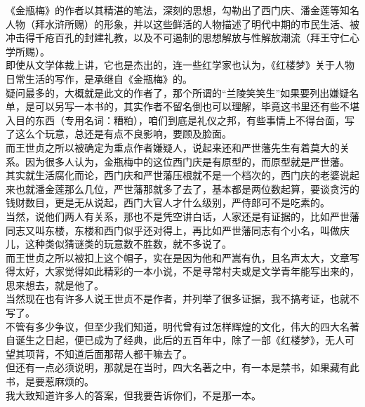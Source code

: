 \begin{multicols}{\theparacolNo}
《金瓶梅》的作者以其精湛的笔法，深刻的思想，勾勒出了西门庆、潘金莲等知名人物（拜水浒所赐）的形象，并以这些鲜活的人物描述了明代中期的市民生活、被冲击得千疮百孔的封建礼教，以及不可遏制的思想解放与性解放潮流（拜王守仁心学所赐）。\\

即使从文学体裁上讲，它也是杰出的，连一些红学家也认为，《红楼梦》关于人物日常生活的写作，是承继自《金瓶梅》的。\\

疑问最多的，大概就是此文的作者了，那个所谓的“兰陵笑笑生”如果要列出嫌疑名单，是可以另写一本书的，其实作者不留名倒也可以理解，毕竟这书里还有些不堪入目的东西（专用名词：糟粕），咱们到底是礼仪之邦，有些事情上不得台面，写了这么个玩意，总还是有点不良影响，要顾及脸面。\\

而王世贞之所以被确定为重点作者嫌疑人，说起来还和严世藩先生有着莫大的关系。因为很多人认为，金瓶梅中的这位西门庆是有原型的，而原型就是严世藩。\\

其实就生活腐化而论，西门庆和严世藩压根就不是一个档次的，西门庆的老婆说起来也就潘金莲那么几位，严世藩那就多了去了，基本都是两位数起算，要谈贪污的钱财数目，更是无从说起，西门大官人才什么级别，严侍郎可不是吃素的。\\

当然，说他们两人有关系，那也不是凭空讲白话，人家还是有证据的，比如严世藩同志又叫东楼，东楼和西门似乎还对得上，再比如严世藩同志有个小名，叫做庆儿，这种类似猜谜类的玩意数不胜数，就不多说了。\\

而王世贞之所以被扣上这个帽子，实在是因为他和严嵩有仇，且名声太大，文章写得太好，大家觉得如此精彩的一本小说，不是寻常村夫或是文学青年能写出来的，思来想去，就是他了。\\

当然现在也有许多人说王世贞不是作者，并列举了很多证据，我不搞考证，也就不写了。\\

不管有多少争议，但至少我们知道，明代曾有过怎样辉煌的文化，伟大的四大名著自诞生之日起，便已成为了经典，此后的五百年中，除了一部《红楼梦》，无人可望其项背，不知道后面那帮人都干嘛去了。\\

但还有一点必须说明，那就是在当时，四大名著之中，有一本是禁书，如果藏有此书，是要惹麻烦的。\\

我大致知道许多人的答案，但我要告诉你们，不是那一本。\\


\end{multicols}
